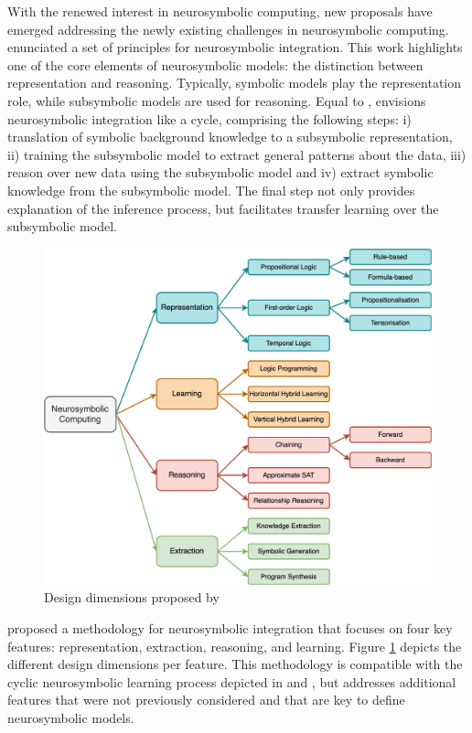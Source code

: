 With the renewed interest in neurosymbolic computing, new proposals have emerged addressing the newly existing challenges in neurosymbolic computing. \cite{besold_neural-symbolic_2017} enunciated a set of principles for neurosymbolic integration. This work highlights one of the core elements of neurosymbolic models: the distinction between representation and reasoning. Typically, symbolic models play the representation role, while subsymbolic models are used for reasoning. Equal to \cite{bader_dimensions_2005}, \cite{besold_neural-symbolic_2017} envisions neurosymbolic integration like a cycle, comprising the following steps: i) translation of symbolic background knowledge to a subsymbolic representation, ii) training the subsymbolic model to extract general patterns about the data, iii) reason over new data using the subsymbolic model and iv) extract symbolic knowledge from the subsymbolic model. The final step not only provides explanation of the inference process, but facilitates transfer learning over the subsymbolic model.

\begin{figure}[h]
    \centering
    \includegraphics[width=.9\linewidth]{3_stateoftheart/figures/garcez_design.eps}
    \caption{Design dimensions proposed by \cite{garcez_neural-symbolic_2019}}
    \label{fig:garcez_design}
\end{figure}

\cite{garcez_neural-symbolic_2019} proposed a methodology for neurosymbolic integration that focuses on four key features: representation, extraction, reasoning, and learning. Figure \ref{fig:garcez_design} depicts the different design dimensions per feature. This methodology is compatible with the cyclic neurosymbolic learning process depicted in \cite{bader_dimensions_2005} and \cite{besold_neural-symbolic_2017}, but addresses additional features that were not previously considered and that are key to define neurosymbolic models.

